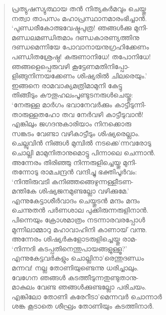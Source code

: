 \begin{verse}
പ്രത്യുഷസ്യുത്ഥായ തന്‍ നിത്യകര്‍മവും ചെയ്തു\\
നത്വാ താപസം മഹാപ്രസ്ഥാനമാരംഭിച്ചാന്‍.\\
‘പുണ്ഡരീകോത്ഭവേഷ്ടപുത്ര! ഞങ്ങള്‍ക്കു മുനി-\\
മണ്ഡലമണ്ഡിതമാം ദണ്ഡകാരണ്യത്തിനു\\
ദണ്ഡമെന്നിയേ പോവാനായനുഗ്രഹിക്കേണം\\
പണ്ഡിതശ്രേഷ്ഠ! കരുണാനിധേ! തപോനിധേ!\\
ഞങ്ങളെപ്പെരുവഴി കൂട്ടേണമതിനിപ്പോ-\\
ളിങ്ങുനിന്നയക്കേണം ശിഷ്യരില്‍ ചിലരെയും.’\\
ഇങ്ങനെ രാമവാക്യമത്രിമാമുനി കേട്ടു\\
തിങ്ങീടും കൗതൂഹലംപൂണ്ടുടനരുള്‍ചെയ്തു:\\
‘നേരുള്ള മാര്‍ഗം ഭവാനേവര്‍ക്കും കാട്ടീടുന്നി-\\
താരുള്ളതഹോ തവ നേര്‍വഴി കാട്ടീടുവാന്‍!\\
എങ്കിലും ജഗദനുകാരിയാം നിനക്കൊരു\\
സങ്കടം വേണ്ടാ വഴികാട്ടീടും ശിഷ്യരെല്ലാം.\\
ചെല്ലുവിന്‍ നിങ്ങള്‍ മുമ്പില്‍ നടക്കെ’ന്നവരോടു\\
ചൊല്ലി മാമുനിതാനുമൊട്ടു പിന്നാലെ ചെന്നാന്‍.\\
അന്നേരം തിരിഞ്ഞു നിന്നരുളിച്ചെയ്തു മുനി-\\
തന്നോടു രാമചന്ദ്രന്‍ വന്ദിച്ചു ഭക്തിപൂര്‍വം:\\
‘നിന്തിരുവടി കനിഞ്ഞങ്ങെഴുന്നള്ളീടണ-\\
മന്തികേ ശിഷ്യജനമുണ്ടല്ലോ വഴിക്കുമേ.’\\
എന്നുകേട്ടാശീര്‍വാദം ചെയ്തുടന്‍ മന്ദം മന്ദം\\
ചെന്നുതന്‍ പര്‍ണശാല പുക്കിരുന്നരുളിനാന്‍.\\
പിന്നെയും ക്രോശമാത്രം നടന്നാരവരപ്പോള്‍\\
മുന്നിലാമ്മാറു മഹാവാഹിനി കാണായ് വന്നു.\\
അന്നേരം ശിഷ്യര്‍കളോടരുളിച്ചെയ്തു രാമ-\\
‘നിന്നദി കടപ്പതിനെന്തുപായങ്ങളുള്ളൂ?’\\
എന്നുകേട്ടവര്‍കളും ചൊല്ലിനാ’രെന്തുദണ്ഡം\\
മന്നവ! നല്ല തോണിയുണ്ടെന്നു ധരിച്ചാലും.\\
വേഗേന ഞങ്ങള്‍ കടത്തീടുന്നതുണ്ടുതാനു-\\
മാകുലം വേണ്ട ഞങ്ങള്‍ക്കുണ്ടല്ലോ പരിചയം.\\
എങ്കിലോ തോണി കരേറീടാ’മെന്നവര്‍ ചൊന്നാര്‍\\
ശങ്ക കൂടാതെ ശീഘ്രം തോണിയും കടത്തിനാര്‍.\\

\end{verse}
